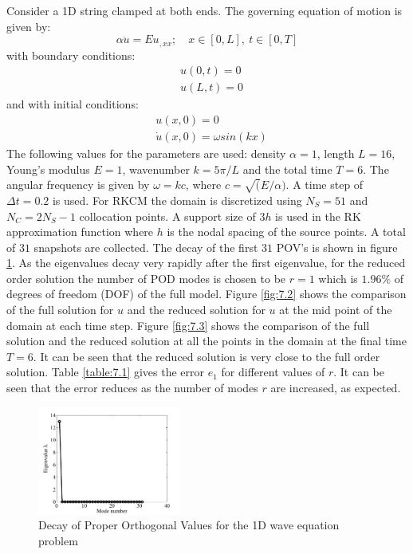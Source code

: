 \documentclass[10pt,letterpaper, onecolumn]{article}
\begin{document}
Consider a 1D string clamped at both ends. The governing equation of motion is given by:
%
\begin{equation}
\alpha \ddot{u} = E u_{,xx}; \quad x \in [0, L], \ t \in [0, T]
\end{equation}
%
with boundary conditions: 
%
\begin{subequations}
\begin{align}
& u(0,t) = 0 \\
& u(L,t) = 0
\end{align}
\end{subequations}
%
and with initial conditions:
%
\begin{subequations}
\begin{align}
& u(x,0) = 0 \\
& \dot{u}(x,0) = \omega sin(kx)
\end{align}
\end{subequations}
%
The following values for the parameters are used: density $\alpha = 1$, length $L=16$, Young's modulus $E=1$, wavenumber $k = 5 \pi /L$ and the total time $T = 6$. The angular frequency is given by $\omega = k c$, where $c = \sqrt(E/\alpha)$. A time step of $\Delta t = 0.2$ is used. For RKCM the domain is discretized using $N_S = 51$ and $N_C = 2 N_S-1$ collocation points. A support size of $3h$ is used in the RK approximation function where $h$ is the nodal spacing of the source points. A total of $31$ snapshots are collected. The decay of the first $31$ POV's is shown in figure \ref{fig:7.1}. As the eigenvalues decay very rapidly after the first eigenvalue, for the reduced order solution the number of POD modes is chosen to be $r=1$ which is $1.96\%$ of degrees of freedom (DOF) of the full model. Figure \ref{fig:7.2} shows the comparison of the full solution for $u$ and the reduced solution for $u$ at the mid point of the domain at each time step. Figure \ref{fig:7.3} shows the comparison of the full solution and the reduced solution at all the points in the domain at the final time $T = 6$. It can be seen that the reduced solution is very close to the full order solution. Table \ref{table:7.1} gives the error $e_1$ for different values of $r$. It can be seen that the error reduces as the number of modes $r$ are increased, as expected.
%
%
\begin{figure}[H]  %
  \begin{center}
    \includegraphics[width=0.42\textwidth,keepaspectratio=1,scale=1]{images/string_decay-eps-converted-to.pdf}
  \end{center}
  \caption{Decay of Proper Orthogonal Values for the 1D wave equation problem}
  \label{fig:7.1}
\end{figure}
\end{document}
